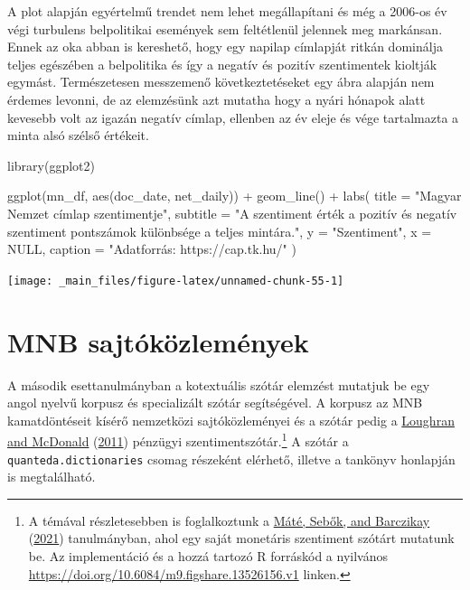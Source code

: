 \documentclass[
]{book}
\newenvironment{Shaded}{\begin{snugshade}}{\end{snugshade}}
\newcommand{\AttributeTok}[1]{\textcolor[rgb]{0.77,0.63,0.00}{#1}}
\newcommand{\ConstantTok}[1]{\textcolor[rgb]{0.00,0.00,0.00}{#1}}
\newcommand{\FunctionTok}[1]{\textcolor[rgb]{0.00,0.00,0.00}{#1}}
\newcommand{\NormalTok}[1]{#1}
\newcommand{\SpecialCharTok}[1]{\textcolor[rgb]{0.00,0.00,0.00}{#1}}
\newcommand{\StringTok}[1]{\textcolor[rgb]{0.31,0.60,0.02}{#1}}
\begin{document}
A plot alapján egyértelmű trendet nem lehet megállapítani és még a
2006-os év végi turbulens belpolitikai események sem feltétlenül
jelennek meg markánsan. Ennek az oka abban is kereshető, hogy egy
napilap címlapját ritkán dominálja teljes egészében a belpolitika és így
a negatív és pozitív szentimentek kioltják egymást. Természetesen
messzemenő következtetéseket egy ábra alapján nem érdemes levonni, de az
elemzésünk azt mutatha hogy a nyári hónapok alatt kevesebb volt az
igazán negatív címlap, ellenben az év eleje és vége tartalmazta a minta
alsó szélső értékeit.

\begin{Shaded}
\begin{Highlighting}[]
\FunctionTok{library}\NormalTok{(ggplot2)}
\end{Highlighting}
\end{Shaded}

\begin{Shaded}
\begin{Highlighting}[]
\FunctionTok{ggplot}\NormalTok{(mn\_df, }\FunctionTok{aes}\NormalTok{(doc\_date, net\_daily)) }\SpecialCharTok{+}
  \FunctionTok{geom\_line}\NormalTok{() }\SpecialCharTok{+}
  \FunctionTok{labs}\NormalTok{(}
    \AttributeTok{title =} \StringTok{"Magyar Nemzet címlap szentimentje"}\NormalTok{,}
    \AttributeTok{subtitle =} \StringTok{"A szentiment érték a pozitív és negatív szentiment pontszámok különbsége a teljes mintára."}\NormalTok{,}
    \AttributeTok{y =} \StringTok{"Szentiment"}\NormalTok{,}
    \AttributeTok{x =} \ConstantTok{NULL}\NormalTok{,}
    \AttributeTok{caption =} \StringTok{"Adatforrás: https://cap.tk.hu/"}
\NormalTok{  )}
\end{Highlighting}
\end{Shaded}

\begin{center}\texttt{[image: \_main\_files/figure-latex/unnamed-chunk-55-1]} \end{center}

\hypertarget{mnb-sajtuxf3kuxf6zlemuxe9nyek}{%
\section{MNB sajtóközlemények}\label{mnb-sajtuxf3kuxf6zlemuxe9nyek}}

A második esettanulmányban a kotextuális szótár elemzést mutatjuk be egy
angol nyelvű korpusz és specializált szótár segítségével. A korpusz az
MNB kamatdöntéseit kísérő nemzetközi sajtóközleményei és a szótár pedig
a \protect\hyperlink{ref-loughran2011}{Loughran and McDonald}
(\protect\hyperlink{ref-loughran2011}{2011}) pénzügyi
szentimentszótár.\footnote{A témával részletesebben is foglalkoztunk a
  \protect\hyperlink{ref-muxe1tuxe92021}{Máté, Sebők, and Barczikay}
  (\protect\hyperlink{ref-muxe1tuxe92021}{2021}) tanulmányban, ahol egy
  saját monetáris szentiment szótárt mutatunk be. Az implementáció és a
  hozzá tartozó R forráskód a nyilvános
  \url{https://doi.org/10.6084/m9.figshare.13526156.v1} linken.} A
szótár a \texttt{quanteda.dictionaries} csomag részeként elérhető,
illetve a tankönyv honlapján is megtalálható.
\end{document}
